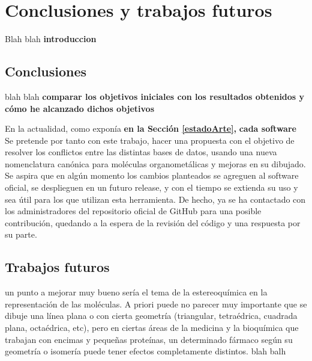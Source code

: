 \chapter{Conclusiones y trabajos futuros}

Blah blah \textbf{introduccion}

\section{Conclusiones}

blah blah \textbf{comparar los objetivos iniciales con los resultados obtenidos y cómo he alcanzado dichos objetivos}

En la actualidad, como exponía \textbf{en la Sección \ref{estadoArte}, } \textbf{cada software }
Se pretende por tanto con este trabajo, hacer una propuesta con el objetivo de resolver los conflictos entre las distintas bases de datos, usando una nueva nomenclatura canónica para moléculas organometálicas y mejoras en su dibujado.
Se aspira que en algún momento los cambios planteados se agreguen al software oficial, se desplieguen en un futuro release, y con el tiempo se extienda su uso y sea útil para los que utilizan esta herramienta. De hecho, ya se ha contactado con los administradores del repositorio oficial de GitHub para una posible contribución, quedando a la espera de la revisión del código y una respuesta por su parte.


\section{Trabajos futuros}

un punto a mejorar muy bueno sería el tema de la estereoquímica en la representación de las moléculas. A priori puede no parecer muy importante que se dibuje una línea plana o con cierta geometría (triangular, tetraédrica, cuadrada plana, octaédrica, etc), pero en ciertas áreas de la medicina y la bioquímica que trabajan con encimas y pequeñas proteínas, un determinado fármaco según su geometría o isomería puede tener efectos completamente distintos.
blah balh